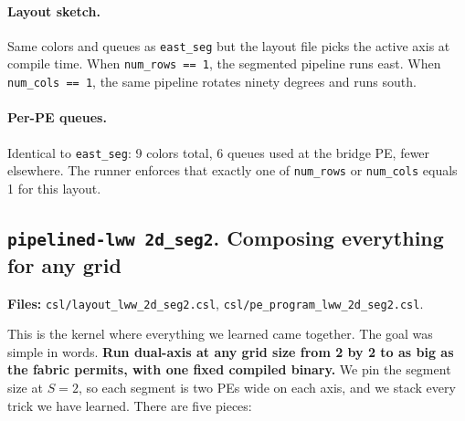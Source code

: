 \documentclass[11pt]{article}
\newcommand{\code}[1]{\texttt{#1}}
\newcommand{\file}[1]{\texttt{#1}}
\begin{document}
\paragraph{Layout sketch.} Same colors and queues as
\code{east\_seg} but the layout file picks the active axis at
compile time. When \code{num\_rows == 1}, the segmented pipeline
runs east. When \code{num\_cols == 1}, the same pipeline rotates
ninety degrees and runs south.

\begin{center}
\end{center}

\paragraph{Per-PE queues.} Identical to \code{east\_seg}: 9
colors total, 6 queues used at the bridge PE, fewer elsewhere.
The runner enforces that exactly one of \code{num\_rows} or
\code{num\_cols} equals 1 for this layout.

\subsection{\code{pipelined-lww 2d\_seg2}. Composing everything for any grid}
\textbf{Files:} \file{csl/layout\_lww\_2d\_seg2.csl},
\file{csl/pe\_program\_lww\_2d\_seg2.csl}.

This is the kernel where everything we learned came together.
The goal was simple in words. \textbf{Run dual-axis at any grid
size from 2 by 2 to as big as the fabric permits, with one
fixed compiled binary.} We pin the segment size at $S = 2$, so
each segment is two PEs wide on each axis, and we stack every
trick we have learned. There are five pieces:
\end{document}
